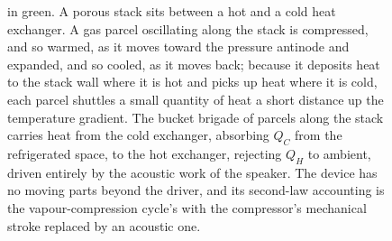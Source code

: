 \begin{figure}[htbp]
{in green. A porous stack sits between a hot and a cold heat exchanger. A gas parcel
oscillating along the stack is compressed, and so warmed, as it moves toward the
pressure antinode and expanded, and so cooled, as it moves back; because it
deposits heat to the stack wall where it is hot and picks up heat where it is cold,
each parcel shuttles a small quantity of heat a short distance up the temperature
gradient. The bucket brigade of parcels along the stack carries heat from the cold
exchanger, absorbing $Q_C$ from the refrigerated space, to the hot exchanger,
rejecting $Q_H$ to ambient, driven entirely by the acoustic work of the speaker.
The device has no moving parts beyond the driver, and its second-law accounting is
the vapour-compression cycle's with the compressor's mechanical stroke replaced by
an acoustic one.}
\label{fig:vol04ch04:thermoacoustic}
\end{figure}
